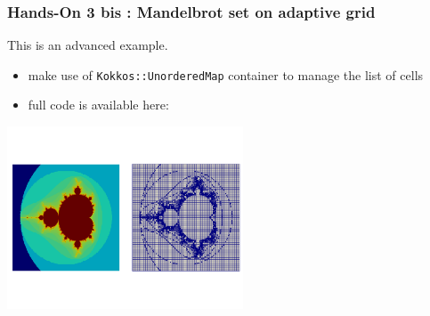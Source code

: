 \begin{frame}[fragile=singleslide]
  \frametitle{Hands-On 3 bis : Mandelbrot set on adaptive grid}

  This is an advanced example.

  \begin{itemize}
  \item make use of \texttt{Kokkos::UnorderedMap} container to manage the list of cells
  \item full code is available here:\\
  \end{itemize}

  \begin{center}
    \includegraphics[width=7cm]{images/mandelbrot_level_6_11}
  \end{center}
  
\end{frame}